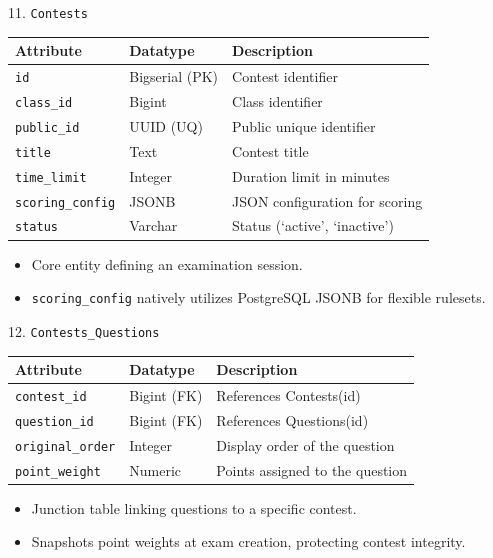 \documentclass[aspectratio=169, 10pt]{beamer}
\begin{document}
\begin{frame}{11. \texttt{Contests}}
    \centering
    \small
    \begin{tabular}{|l|l|p{8cm}|}
        \hline
        \textbf{Attribute} & \textbf{Datatype} & \textbf{Description} \\ \hline
        \texttt{id} & Bigserial (PK) & Contest identifier\\ \hline
        \texttt{class\_id} & Bigint & Class identifier\\ \hline
        \texttt{public\_id} & UUID (UQ) & Public unique identifier\\ \hline
        \texttt{title} & Text & Contest title\\ \hline
        \texttt{time\_limit} & Integer & Duration limit in minutes\\ \hline
        \texttt{scoring\_config} & JSONB & JSON configuration for scoring\\ \hline
        \texttt{status} & Varchar & Status (`active', `inactive')\\ \hline
    \end{tabular}
    \vspace{0.3cm}
    \begin{itemize}
        \item Core entity defining an examination session.
        \item \texttt{scoring\_config} natively utilizes PostgreSQL JSONB for flexible rulesets.
    \end{itemize}
\end{frame}


\begin{frame}{12. \texttt{Contests\_Questions}}
    \centering
    \small
    \begin{tabular}{|l|l|p{8cm}|}
        \hline
        \textbf{Attribute} & \textbf{Datatype} & \textbf{Description} \\ \hline
        \texttt{contest\_id} & Bigint (FK) & References Contests(id)\\ \hline
        \texttt{question\_id} & Bigint (FK) & References Questions(id)\\ \hline
        \texttt{original\_order} & Integer & Display order of the question\\ \hline
        \texttt{point\_weight} & Numeric & Points assigned to the question\\ \hline
    \end{tabular}
    \vspace{0.3cm}
    \begin{itemize}
        \item Junction table linking questions to a specific contest.
        \item Snapshots point weights at exam creation, protecting contest integrity.
    \end{itemize}
\end{frame}
\end{document}
